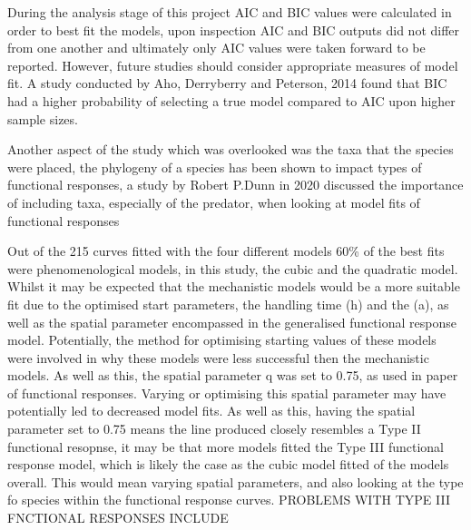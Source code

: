 \documentclass[11pt]{article}
\begin{document}
During the analysis stage of this project AIC and BIC values were calculated in order to best fit the models, upon inspection AIC and BIC outputs did not differ from one another and ultimately only AIC values were taken forward to be reported. However, future studies should consider appropriate measures of model fit. A study conducted by Aho, Derryberry and Peterson, 2014 found that BIC had a higher probability of selecting a true model compared to AIC upon higher sample sizes. 



Another aspect of the study which was overlooked was the taxa that the species were placed, the phylogeny of a species has been shown to impact types of functional responses, a study by Robert P.Dunn in 2020 discussed the importance of including taxa, especially of the predator, when looking at model fits of functional responses



Out of the 215 curves fitted with the four different models 60\% of the best fits were phenomenological models, in this study, the cubic and the quadratic model. Whilst it may be expected that the mechanistic models would be a more suitable fit due to the optimised start parameters, the handling time (h) and the            (a), as well as the spatial parameter encompassed in the generalised functional response model. Potentially, the method for optimising starting values of these models were involved in why these models were less successful then the mechanistic models. As well as this, the spatial parameter q was set to 0.75, as used in \cite{Pawar2012} paper of functional responses. Varying or optimising this spatial parameter may have potentially led to decreased model fits. As well as this, having the spatial parameter set to 0.75 means the line produced closely resembles a Type II functional resopnse, it may be that more models fitted the Type III functional response model, which is likely the case as the cubic model fitted           of the models overall. This would mean varying spatial parameters, and also looking at the type fo species within the functional response curves.    PROBLEMS WITH TYPE III FNCTIONAL RESPONSES INCLUDE 

	
\newpage


\vspace*{1\baselineskip}
\printbibliography 


\newpage
\end{document}
